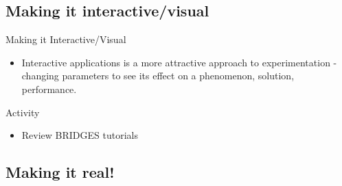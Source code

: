 \documentclass[aspectratio=169]{beamer}
\begin{document}

\subsection{Making it interactive/visual}

\begin{frame}{Making it Interactive/Visual}
\begin{itemize}
	\item Interactive applications is a more attractive approach to 
		experimentation - changing parameters to see its effect on a 
		phenomenon, solution, performance.
\end{itemize}
\end{frame}
\begin{frame}{Activity}
\begin{itemize}
	\item Review BRIDGES tutorials 
\end{itemize}
\end{frame}
%
\subsection{Making it real!}
\end{document}
